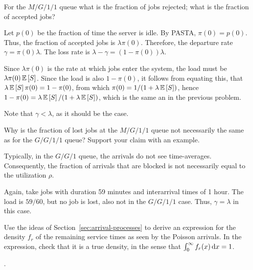\begin{question}
  For the $M/G/1/1$ queue what is the fraction of jobs rejected; what
  is the fraction of accepted jobs?
  \begin{solution}
 Let $p(0)$ be the fraction of time the server is idle. By
      PASTA, $\pi(0)=p(0)$. Thus, the fraction of accepted jobs is
      $\lambda\pi(0)$. Therefore, the departure rate
      $\gamma=\pi(0)\lambda$. The loss rate  is $\lambda-\gamma = (1-\pi(0))\lambda$. 

      Since $\lambda\pi(0)$ is the rate at which jobs enter the
      system, the load must be $\lambda\pi(0)\,\mathbb{E}\left[S\right]$. Since the load is also $1-\pi(0)$, it follows from equating this, that  $\lambda \,\mathbb{E}\left[S\right] \pi(0) = 1-\pi(0)$, from which $\pi(0)=1/(1+\lambda\,\mathbb{E}\left[S\right])$, hence $1-\pi(0) = \lambda \,\mathbb{E}\left[S\right]/(1+\lambda \,\mathbb{E}\left[S\right])$, which is the same an in the previous problem.

Note that  $\gamma < \lambda$, as it should be the case. 

  \end{solution}
\end{question}


\begin{question}
  Why is the fraction of lost jobs at the $M/G/1/1$ queue not
  necessarily the same as for the $G/G/1/1$ queue?  Support your claim
  with an example.
  \begin{solution}
 Typically, in the $G/G/1$ queue, the arrivals do not see  time-averages. Consequently, the fraction of arrivals that are blocked is not necessarily equal to the utilization $\rho$.

  Again, take jobs with duration 59 minutes and interarrival times of
  1 hour. The load is $59/60$, but no job is lost, also not in the
  $G/G/1/1$ case. Thus, $\gamma=\lambda$ in this case.
  \end{solution}
\end{question}


\begin{question}[use=false]
  Use the ideas of Section~\ref{sec:arrival-processes} to derive an
  expression for the density $f_r$ of the remaining service times as
  seen by the Poisson arrivals.  In the expression, check that it is a
  true density, in the sense that $\int_0^\infty f_r(x) \,\text{d}x =1$.
  \begin{solution}
    \TBD.
  \end{solution}
\end{question}





